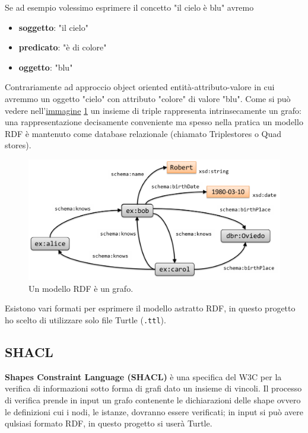 \documentclass{article}
\begin{document}
Se ad esempio volessimo esprimere il concetto "il cielo è blu" avremo 
\begin{itemize}
    \item [] \textbf{soggetto}: "il cielo"
    \item [] \textbf{predicato}: "è di colore"
    \item [] \textbf{oggetto}: "blu"
\end{itemize}

Contrariamente ad approccio object oriented entità-attributo-valore in cui avremmo un oggetto "cielo" con attributo "colore" di valore "blu". Come si può vedere nell'\href{https://book.validatingrdf.com/bookHtml008.html}{immagine} \ref{fig:graph} un insieme di triple rappresenta intrinsecamente un grafo: una rappresentazione decisamente conveniente ma spesso nella pratica un modello RDF è mantenuto come database relazionale (chiamato Triplestores o Quad stores).

\begin{figure}[h!t]
    \caption{Un modello RDF è un grafo.}
    \label{fig:graph}
    \includegraphics[scale=0.3]{images/RDFGraph.png}
    \centering
\end{figure}

Esistono vari formati per esprimere il modello astratto RDF, in questo progetto ho scelto di utilizzare solo file Turtle (\texttt{.ttl}).

\subsection{SHACL}
\textbf{Shapes Constraint Language (SHACL)} è una specifica del W3C per la verifica di informazioni sotto forma di grafi dato un insieme di vincoli. Il processo di verifica prende in input un grafo contenente le dichiarazioni delle shape ovvero le definizioni cui i nodi, le istanze, dovranno essere verificati; in input si può avere qulsiasi formato RDF, in questo progetto si userà Turtle. 
\end{document}
